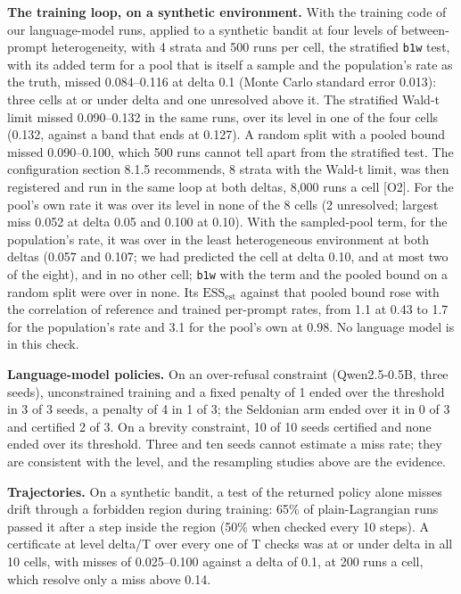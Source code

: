 \documentclass[11pt]{article}
\begin{document}
\textbf{The training loop, on a synthetic environment.} With the training code of our language-model runs, applied to a synthetic bandit at four levels of between-prompt heterogeneity, with 4 strata and 500 runs per cell, the stratified \texttt{b1w} test, with its added term for a pool that is itself a sample and the population's rate as the truth, missed 0.084--0.116 at delta 0.1 (Monte Carlo standard error 0.013): three cells at or under delta and one unresolved above it. The stratified Wald-t limit missed 0.090--0.132 in the same runs, over its level in one of the four cells (0.132, against a band that ends at 0.127). A random split with a pooled bound missed 0.090--0.100, which 500 runs cannot tell apart from the stratified test. The configuration section 8.1.5 recommends, 8 strata with the Wald-t limit, was then registered and run in the same loop at both deltas, 8,000 runs a cell [O2]. For the pool's own rate it was over its level in none of the 8 cells (2 unresolved; largest miss 0.052 at delta 0.05 and 0.100 at 0.10). With the sampled-pool term, for the population's rate, it was over in the least heterogeneous environment at both deltas (0.057 and 0.107; we had predicted the cell at delta 0.10, and at most two of the eight), and in no other cell; \texttt{b1w} with the term and the pooled bound on a random split were over in none. Its $\mathrm{ESS}_{\mathrm{est}}$ against that pooled bound rose with the correlation of reference and trained per-prompt rates, from 1.1 at 0.43 to 1.7 for the population's rate and 3.1 for the pool's own at 0.98. No language model is in this check.


\textbf{Language-model policies.} On an over-refusal constraint (Qwen2.5-0.5B, three seeds), unconstrained training and a fixed penalty of 1 ended over the threshold in 3 of 3 seeds, a penalty of 4 in 1 of 3; the Seldonian arm ended over it in 0 of 3 and certified 2 of 3. On a brevity constraint, 10 of 10 seeds certified and none ended over its threshold. Three and ten seeds cannot estimate a miss rate; they are consistent with the level, and the resampling studies above are the evidence.


\textbf{Trajectories.} On a synthetic bandit, a test of the returned policy alone misses drift through a forbidden region during training: 65\% of plain-Lagrangian runs passed it after a step inside the region (50\% when checked every 10 steps). A certificate at level delta/T over every one of T checks was at or under delta in all 10 cells, with misses of 0.025--0.100 against a delta of 0.1, at 200 runs a cell, which resolve only a miss above 0.14.
\end{document}
